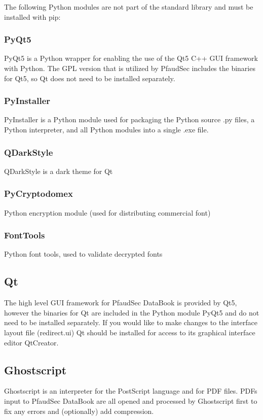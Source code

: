 \documentclass[14pt]{article}
\begin{document}
\begin{flushleft}
The following Python modules are not part of the standard library and must be installed with pip:

		\begin{subs}
		\subsubsection{PyQt5}
PyQt5 is a Python wrapper for enabling the use of the Qt5 C++ GUI framework with Python.
The GPL version that is utilized by PfaudSec includes the binaries for Qt5, so Qt does not need to be installed separately.

		\subsubsection{PyInstaller}
PyInstaller is a Python module used for packaging the Python source .py files, a Python interpreter, and all Python modules into a single .exe file.

		\subsubsection{QDarkStyle}
QDarkStyle is a dark theme for Qt

		\subsubsection{PyCryptodomex}
Python encryption module (used for distributing commercial font)

		\subsubsection{FontTools}
Python font tools, used to validate decrypted fonts
		\end{subs}

	\subsection{Qt}
The high level GUI framework for PfaudSec DataBook is provided by Qt5, however the binaries for Qt are included in the Python module PyQt5 and do not need to be installed separately.
If you would like to make changes to the interface layout file (redirect.ui) Qt should be installed for access to its graphical interface editor QtCreator.

	\subsection{Ghostscript}
Ghostscript is an interpreter for the PostScript language and for PDF files.
PDFs input to PfaudSec DataBook are all opened and processed by Ghostscript first to fix any errors and (optionally) add compression.


\end{flushleft}
\end{document}
